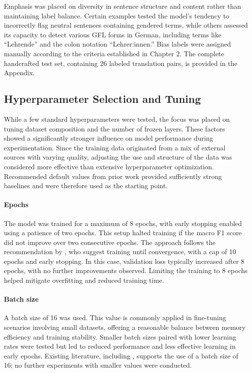     Emphasis was placed on diversity in sentence structure and content rather than maintaining label balance. Certain examples tested the model’s tendency to incorrectly flag neutral sentences containing gendered terms, while others assessed its capacity to detect various GFL forms in German, including terms like “Lehrende” and the colon notation “Lehrer:innen.” Bias labels were assigned manually according to the criteria established in Chapter 2. The complete handcrafted test set, containing 26 labeled translation pairs, is provided in the Appendix.

\subsection{Hyperparameter Selection and Tuning} \label{subsection:hyperparameter_tuning_methodology}
     While a few standard hyperparameters were tested, the focus was placed on tuning dataset composition and the number of frozen layers. These factors showed a significantly stronger influence on model performance during experimentation. Since the training data originated from a mix of external sources with varying quality, adjusting the use and structure of the data was considered more effective than extensive hyperparameter optimization. Recommended default values from prior work provided sufficiently strong baselines and were therefore used as the starting point.

    \paragraph{Epochs} The model was trained for a maximum of 8 epochs, with early stopping enabled using a patience of two epochs. This setup halted training if the macro F1 score did not improve over two consecutive epochs. The approach follows the recommendation by \textcite{pecherComparingSpecialisedSmall2024}, who suggest training until convergence, with a cap of 10 epochs and early stopping. In this case, validation loss typically increased after 8 epochs, with no further improvements observed. Limiting the training to 8 epochs helped mitigate overfitting and reduced training time.

    \paragraph{Batch size} A batch size of 16 was used. This value is commonly applied in fine-tuning scenarios involving small datasets, offering a reasonable balance between memory efficiency and training stability. Smaller batch sizes paired with lower learning rates were tested but led to reduced performance and less effective learning in early epochs. Existing literature, including \textcite{mosbachStabilityFinetuningBERT2021}, supports the use of a batch size of 16; no further experiments with smaller values were conducted.

